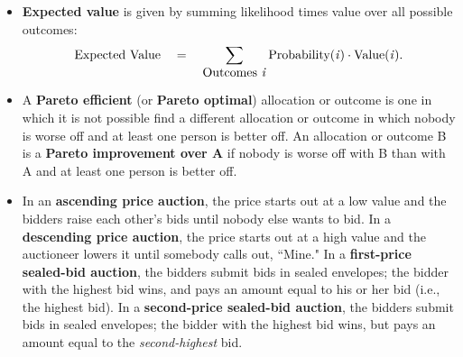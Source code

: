 \documentclass[twoside]{article}
\begin{document}
\begin{EXAM}
\begin{itemize}
\item \textbf{Expected value} is given by summing likelihood times value over all possible outcomes:
\[
\mbox{Expected Value}\ \ \  = \ \ \ \sum_{\mbox{Outcomes \emph{i}}} \mbox{Probability(\emph{i})} \cdot
\mbox{Value(\emph{i})}.
\]


\item A \textbf{Pareto efficient} (or \textbf{Pareto optimal}) allocation or outcome is one in which it is not possible find a different allocation or outcome in which nobody is worse off and at least one person is better off. An allocation or outcome B is a \textbf{Pareto improvement over A} if nobody is worse off with B than with A and at least one person is better off.




\item In an \textbf{ascending price auction}, the price starts out at a low value and the bidders raise each other's bids until nobody else wants to bid. In a \textbf{descending price auction}, the price starts out at a high value and the auctioneer lowers it until somebody calls out, ``Mine." In a \textbf{first-price sealed-bid auction}, the bidders submit bids in sealed envelopes; the bidder with the highest bid wins, and pays an amount equal to his or her bid (i.e., the highest bid). In a \textbf{second-price sealed-bid auction}, the bidders submit bids in sealed envelopes; the bidder with the highest bid wins, but pays an amount equal to the \emph{second-highest} bid.
\end{itemize}
\clearpage %
\end{EXAM}
\end{document}
